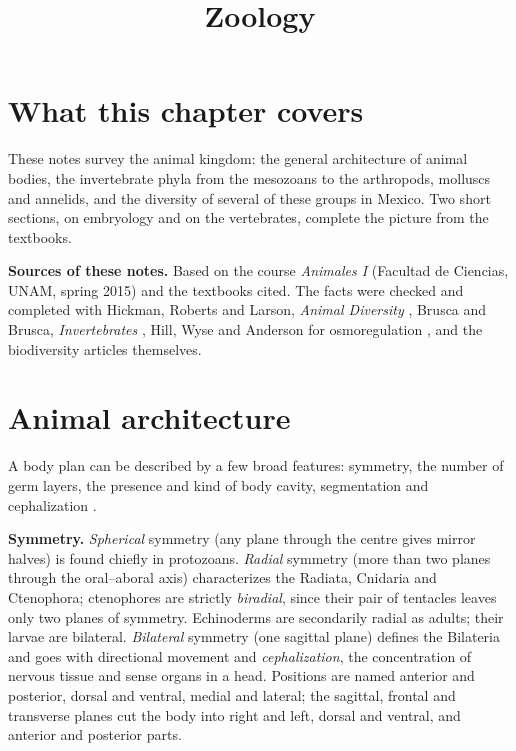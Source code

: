 



\title{Zoology}
\maketitle

\label{section-phantom}

\tableofcontents

\section{What this chapter covers}
\label{section-overview}

These notes survey the animal kingdom:
the general architecture
of animal bodies, the invertebrate phyla from
the mesozoans to the arthropods, molluscs and
annelids, and the diversity of several of
these groups in Mexico. Two short sections,
on embryology and on the vertebrates,
complete the picture from the textbooks.

\textbf{Sources of these notes.} Based on
the course \emph{Animales I}
(Facultad de Ciencias, UNAM, spring 2015)
and the textbooks cited.
The facts were checked and completed with
Hickman, Roberts and Larson, \emph{Animal
Diversity} \cite{hickman2002animal}, Brusca
and Brusca, \emph{Invertebrates}
\cite{brusca2003invertebrates}, Hill, Wyse
and Anderson for osmoregulation
\cite{hill2012animal}, and the biodiversity
articles themselves.

\section{Animal architecture}
\label{section-architecture}

A body plan can be described by a few broad
features: symmetry, the number of germ
layers, the presence and kind of body cavity,
segmentation and cephalization \cite[Chapter
3]{hickman2002animal}.

\textbf{Symmetry.} \emph{Spherical} symmetry
(any plane through the centre gives mirror
halves) is found chiefly in protozoans.
\emph{Radial} symmetry (more than two planes
through the oral--aboral axis) characterizes
the Radiata, Cnidaria and Ctenophora;
ctenophores are strictly \emph{biradial},
since their pair of tentacles leaves only two
planes of symmetry. Echinoderms are
secondarily radial as adults; their larvae
are bilateral. \emph{Bilateral} symmetry (one
sagittal plane) defines the Bilateria and
goes with directional movement and
\emph{cephalization}, the concentration of
nervous tissue and sense organs in a head.
Positions are named anterior and posterior,
dorsal and ventral, medial and lateral; the
sagittal, frontal and transverse planes cut
the body into right and left, dorsal and
ventral, and anterior and posterior parts.

